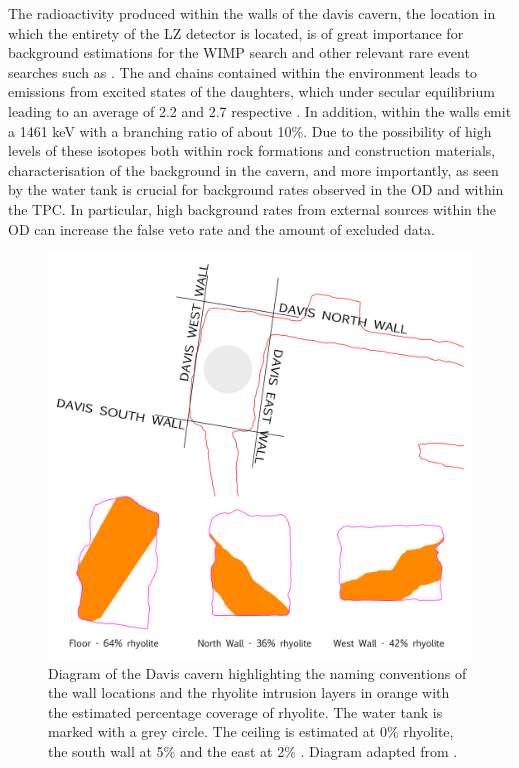 The radioactivity produced within the walls of the davis cavern, the location in which the entirety of the LZ detector is located, is of great importance for background estimations for the WIMP search and other relevant rare event searches such as \neutrinolessDoubleBeta{}. The \UTTE{} and \ThTTT{} chains contained within the environment leads to \gray{} emissions from excited states of the daughters, which under secular equilibrium leading to an average of 2.2 and 2.7 \grays{} respective \cite{MolnarGabor.1997}. In addition, \KFZ{} within the walls emit a 1461 keV \gray{} with a branching ratio of about 10\%. Due to the possibility of high levels of these isotopes both within rock formations and construction materials, characterisation of the \gray{} background in the cavern, and more importantly, as seen by the water tank is crucial for background rates observed in the OD and within the TPC. In particular, high background rates from external sources within the OD can increase the false veto rate and the amount of excluded data. 
%
\begin{figure}[b!]
    \centering
    \includegraphics[scale=0.80]{Chapter_3/Figures/Davis_cavern_rhyolite.png}
    \caption[Schematic of the Davis cavern, showing the rhyolite intrusion layers and the position of the water tank with naming conventions.]
    {Diagram of the Davis cavern highlighting the naming conventions of the wall locations and the rhyolite intrusion layers in orange with the estimated percentage coverage of rhyolite. The water tank is marked with a grey circle. The ceiling is estimated at 0\% rhyolite, the south wall at 5\% and the east at 2\% \cite{Heise_2015}. Diagram adapted from \cite{Akerib_2020_gray_measurements}.}
    \label{fig:davis_cavern_walls}
\end{figure}
%

